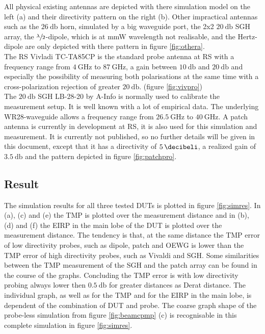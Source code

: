 All physical existing antennas are depicted with there simulation model on the left (a) and their directivity pattern on the right (b). Other impractical antennas such as the $\SI{26}{\decibel}$ horn, simulated by a big waveguide port, the 2x2 $\SI{20}{\decibel}$ \ac{SGH} array, the $\sfrac{\lambda}{2}$-dipole, which is at \ac{mmW} wavelength not realisable, and the Hertz-dipole are only depicted with there pattern in figure \ref{fig:othera}.\\
The \ac{RS} Vivladi TC-TA85CP is the standard probe antenna at \ac{RS} with a frequency range from $\SI{4}{\giga\hertz}$ to $\SI{87}{\giga\hertz}$, a gain between $\SI{10}{\decibel}$ and $\SI{20}{\decibel}$ and especially the possibility of measuring both polarisations at the same time with a cross-polarization rejection of greater $\SI{20}{\decibel}$. (figure \ref{fig:vivpro})\\
The $\SI{20}{\decibel}$ \ac{SGH} LB-28-20 by A-Info is normally used to calibrate the measurement setup. It is well known with a lot of empirical data. The underlying WR28-waveguide allows a frequency range from $\SI{26.5}{\giga\hertz}$ to $\SI{40}{\giga\hertz}$. A patch antenna is currently in development at \ac{RS}, it is also used for this simulation and measurement. It is currently not published, so  no further details will be given in this document, except that it has a directivity of $\SI{5}{\decibeli}$, a realized gain of $\SI{3.5}{\decibel}$ and the pattern depicted in figure \ref{fig:patchpro}. 

\subsection{Result}

The simulation results for all three tested \acp{DUT} is plotted in figure \ref{fig:simres}. In (a), (c) and (e) the \ac{TMP} is plotted over the measurement distance and in (b), (d) and (f) the \ac{EIRP} in the main lobe of the \ac{DUT} is plotted over the measurement distance. The tendency is that, at the same distance the \ac{TMP} error of low directivity probes, such as dipole, patch and \ac{OEWG} is lower than the \ac{TMP} error of high directivity probes, such as Vivaldi and \ac{SGH}. Some similarities between the \ac{TMP} measurement of the \ac{SGH} and the patch array can be found in the course of the graphs. Concluding the \ac{TMP} error is with low directivity probing always lower then $\SI{0.5}{\decibel}$ for greater distances as Derat distance. The individual graph, as well as for the \ac{TMP} and for the \ac{EIRP} in the main lobe, is dependent of the combination of \ac{DUT} and probe. The coarse graph shape of the probe-less simulation from figure \ref{fig:beamcpmp} (c) is recognisable in this complete simulation in figure \ref{fig:simres}.

